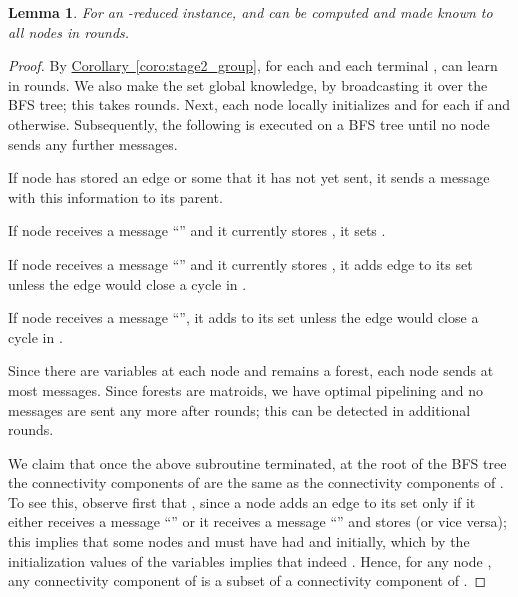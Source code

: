 \documentclass[letterpaper,11pt]{article}
\newtheorem{lemma}[theorem]{Lemma}
\newcommand{\namedref}[2]{\hyperref[#2]{#1~\ref*{#2}}}
\newcommand{\corollaryref}[1]{\namedref{Corollary}{#1}}
\begin{document}
\begin{lemma}\label{lemma:stage2_compute}
For an -reduced instance,  and  can be computed and
made known to all nodes in  rounds.
\end{lemma}
\begin{proof}
By \corollaryref{coro:stage2_group}, for each  and each terminal
,  can learn  in  rounds. We also make
the set  global knowledge, by broadcasting it over the BFS tree; this
takes  rounds. Next, each node
 locally initializes  and  for each
 if  and  otherwise.
Subsequently, the following is executed on a BFS tree until no node sends any
further messages.
\begin{compactitem}
\item If node  has stored an edge  or some  that it has not yet sent, it sends a message with this information to its
parent.
\item If node  receives a message ``'' and it currently stores
, it sets .
\item If node  receives a message ``'' and it currently stores
, it adds edge  to its set 
unless the edge would close a cycle in .
\item If node  receives a message ``'', it adds
 to its set  unless the edge would close a cycle in
.
\end{compactitem}
Since there are  variables  at each node 
and  remains a forest, each node sends at most  messages.
Since forests are matroids, we have optimal pipelining and no messages are sent
any more after  rounds; this can be detected in additional
 rounds.

We claim that once the above subroutine terminated, at the root  of the BFS
tree the connectivity components of  are the same as the
connectivity components of . To see this, observe first
that , since a node  adds an edge
 to its set  only if it either receives a message
``'' or it receives a message ``'' and stores
 (or vice versa); this implies that some nodes  and
 must have had  and  initially, which
by the initialization values of the variables implies that indeed
. Hence, for any node , any connectivity
component of  is a subset of a connectivity component of
.


\end{proof}
\end{document}

